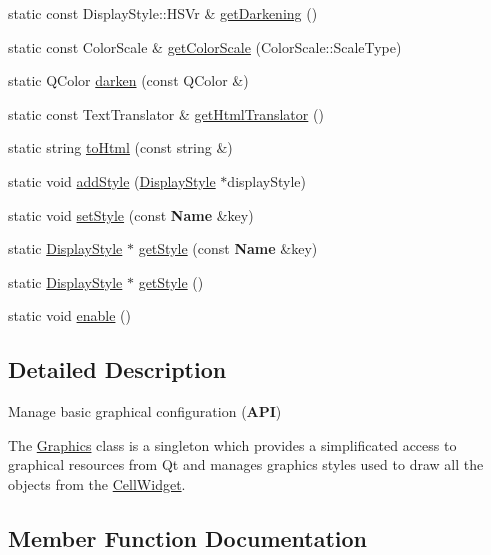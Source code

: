 \begin{DoxyCompactItemize}
\item 
static const Display\+Style\+::\+H\+S\+Vr \& \hyperlink{classHurricane_1_1Graphics_af34b6fe518ecb3f2959731f055ee27ff}{get\+Darkening} ()
\item 
static const Color\+Scale \& \hyperlink{classHurricane_1_1Graphics_a8735a458885beb3b74ad5fb77db82797}{get\+Color\+Scale} (Color\+Scale\+::\+Scale\+Type)
\item 
static Q\+Color \hyperlink{classHurricane_1_1Graphics_ab4c69a277249850a397a4c5fce31f965}{darken} (const Q\+Color \&)
\item 
static const Text\+Translator \& \hyperlink{classHurricane_1_1Graphics_a2f5e702ff1ea293edc5a89aaae1facf2}{get\+Html\+Translator} ()
\item 
static string \hyperlink{classHurricane_1_1Graphics_a51b3772138b33a85204abbee08898987}{to\+Html} (const string \&)
\item 
static void \hyperlink{classHurricane_1_1Graphics_ac64dd095224b3f9dfbbdcfc242b11a77}{add\+Style} (\hyperlink{classHurricane_1_1DisplayStyle}{Display\+Style} $\ast$display\+Style)
\item 
static void \hyperlink{classHurricane_1_1Graphics_acb9975e354d7c802fa3064ceb800db90}{set\+Style} (const \textbf{ Name} \&key)
\item 
static \hyperlink{classHurricane_1_1DisplayStyle}{Display\+Style} $\ast$ \hyperlink{classHurricane_1_1Graphics_a2506213ff4c28b22d356e7bfbb242ed6}{get\+Style} (const \textbf{ Name} \&key)
\item 
static \hyperlink{classHurricane_1_1DisplayStyle}{Display\+Style} $\ast$ \hyperlink{classHurricane_1_1Graphics_aef89b1aa2be83b61ae0838a219d2b696}{get\+Style} ()
\item 
static void \hyperlink{classHurricane_1_1Graphics_a08e5240382c4bc97fd84b6fa0e7d8b8e}{enable} ()
\end{DoxyCompactItemize}


\subsection{Detailed Description}
Manage basic graphical configuration ({\bfseries A\+PI}) 

The \hyperlink{classHurricane_1_1Graphics}{Graphics} class is a singleton which provides a simplificated access to graphical resources from Qt and manages graphics styles used to draw all the objects from the \hyperlink{classHurricane_1_1CellWidget}{Cell\+Widget}. 

\subsection{Member Function Documentation}
\mbox{\label{classHurricane_1_1Graphics_a4f8d6eaeef8d9ae781be929e95545f0c}} 
